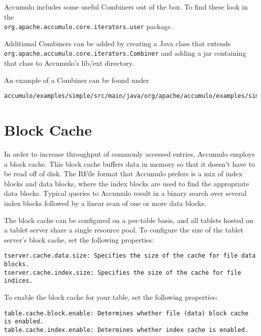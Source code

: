 Accumulo includes some useful Combiners out of the box. To find these look in
the\\ \texttt{org.apache.accumulo.core.iterators.user} package.

Additional Combiners can be added by creating a Java class that extends\\
\texttt{org.apache.accumulo.core.iterators.Combiner} and adding a jar containing that
class to Accumulo's lib/ext directory.

An example of a Combiner can be found under

\begingroup\fontsize{8pt}{8pt}\selectfont\begin{verbatim}
accumulo/examples/simple/src/main/java/org/apache/accumulo/examples/simple/combiner/StatsCombiner.java
\end{verbatim}\endgroup


\section{Block Cache}

In order to increase throughput of commonly accessed entries, Accumulo employs a block cache.
This block cache buffers data in memory so that it doesn't have to be read off of disk.
The RFile format that Accumulo prefers is a mix of index blocks and data blocks, where the index blocks are used to find the appropriate data blocks.
Typical queries to Accumulo result in a binary search over several index blocks followed by a linear scan of one or more data blocks.

The block cache can be configured on a per-table basis, and all tablets hosted on a tablet server share a single resource pool.
To configure the size of the tablet server's block cache, set the following properties:

\begingroup\fontsize{8pt}{8pt}\selectfont\begin{verbatim}
tserver.cache.data.size: Specifies the size of the cache for file data blocks.
tserver.cache.index.size: Specifies the size of the cache for file indices.
\end{verbatim}\endgroup

To enable the block cache for your table, set the following properties:

\begingroup\fontsize{8pt}{8pt}\selectfont\begin{verbatim}
table.cache.block.enable: Determines whether file (data) block cache is enabled.
table.cache.index.enable: Determines whether index cache is enabled.
\end{verbatim}\endgroup

